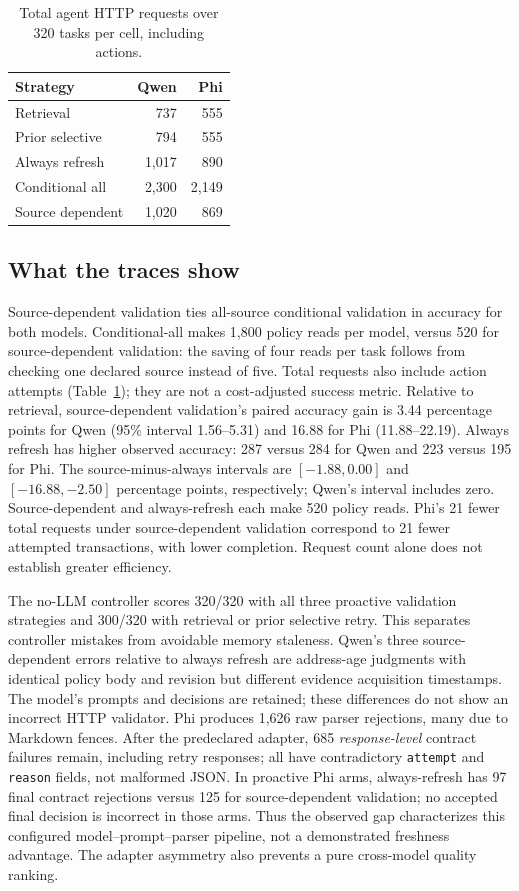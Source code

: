 \documentclass[sigconf,screen,review]{acmart}
\begin{document}
\begin{table}[t]
\caption{Total agent HTTP requests over 320 tasks per cell, including actions.}
\label{tab:requests}
\small
\begin{tabular}{lrr}
\toprule
Strategy & Qwen & Phi \\
\midrule
Retrieval & 737 & 555 \\
Prior selective & 794 & 555 \\
Always refresh & 1,017 & 890 \\
Conditional all & 2,300 & 2,149 \\
Source dependent & 1,020 & 869 \\
\bottomrule
\end{tabular}
\end{table}

\subsection{What the traces show}
Source-dependent validation ties all-source conditional validation in
accuracy for both models. Conditional-all makes 1,800 policy reads per
model, versus 520 for source-dependent validation: the saving of four
reads per task follows from checking one declared source instead of five. Total
requests also include action attempts (Table~\ref{tab:requests}); they are
not a cost-adjusted success metric. Relative to retrieval,
source-dependent validation's paired accuracy gain is 3.44 percentage
points for Qwen (95\% interval 1.56--5.31) and 16.88 for Phi
(11.88--22.19). Always refresh has higher observed accuracy: 287 versus
284 for Qwen and 223 versus 195 for Phi. The source-minus-always intervals
are $[-1.88,0.00]$ and $[-16.88,-2.50]$ percentage points, respectively;
Qwen's interval includes zero. Source-dependent and always-refresh each
make 520 policy reads. Phi's 21 fewer total requests under source-dependent
validation correspond to 21 fewer attempted transactions, with lower
completion. Request count alone does not establish greater efficiency.

The no-LLM controller scores 320/320 with all three proactive validation
strategies and 300/320 with retrieval or prior selective retry. This
separates controller mistakes from avoidable memory staleness. Qwen's three
source-dependent errors relative to always refresh are address-age
judgments with identical policy body and revision but different evidence
acquisition timestamps. The model's prompts and decisions are retained;
these differences do not show an incorrect HTTP validator. Phi produces
1,626 raw parser rejections, many due to Markdown fences. After the
predeclared adapter, 685 \emph{response-level} contract failures remain,
including retry responses; all have contradictory \texttt{attempt} and
\texttt{reason} fields, not malformed JSON. In proactive Phi arms,
always-refresh has 97 final contract rejections versus 125 for
source-dependent validation; no accepted final decision is incorrect in
those arms. Thus the observed gap characterizes this configured
model--prompt--parser pipeline, not a demonstrated freshness advantage.
The adapter asymmetry also prevents a pure cross-model quality ranking.
\end{document}
